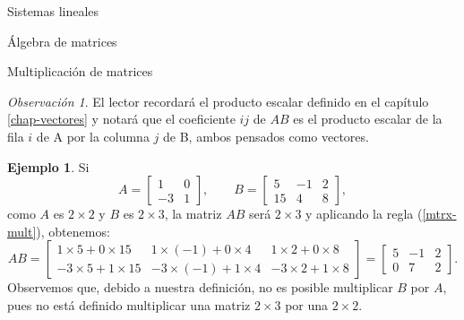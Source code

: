 \documentclass[a4paper,12pt,twoside,spanish]{amsbook}
\theoremstyle{definition}
\newtheorem{ejemplo}{Ejemplo}[section]
\theoremstyle{remark}
\newtheorem{obs}{Observaci\'on}[section]
\begin{document}
\begin{chapter}{Sistemas lineales}
\begin{section}{Álgebra de matrices}
\begin{subsection}{Multiplicación de matrices}
\begin{obs}
					El lector recordará el producto escalar definido en  el capítulo \ref{chap-vectores} y notará que el coeficiente $ij$ de $AB$ es el producto escalar de la fila $i$ de A por la columna $j$ de B, ambos pensados como vectores. 
				\end{obs}	
				
				\begin{ejemplo}
					Si 
					\begin{equation*}
						A = \begin{bmatrix}1&0\\-3&1\end{bmatrix}, \qquad B = \begin{bmatrix}5&-1&2\\15&4&8\end{bmatrix},
					\end{equation*}
					como $A$ es $2 \times 2$ y $B$ es $2 \times 3$, la matriz $AB$ será $2 \times 3$ y  aplicando la regla (\ref{mtrx-mult}), obtenemos:
					\begin{equation*}
						AB = \begin{bmatrix}1\times  5 + 0\times 15&1\times (-1) + 0\times 4&1\times 2 + 0\times 8
							\\-3\times 5 + 1\times 15&-3\times (-1) + 1\times 4&-3\times 2 + 1\times 8
						\end{bmatrix} =
						\begin{bmatrix} 5 &-1 &2 
							\\ 0 &7 &2
						\end{bmatrix}.
					\end{equation*}
					Observemos que, debido a nuestra definición, no es posible multiplicar $B$ por $A$, pues no está definido multiplicar una matriz $2 \times 3$ por una $2 \times 2$.
				\end{ejemplo}
				 	

\end{subsection}
\end{section}
\end{chapter}
\end{document}

